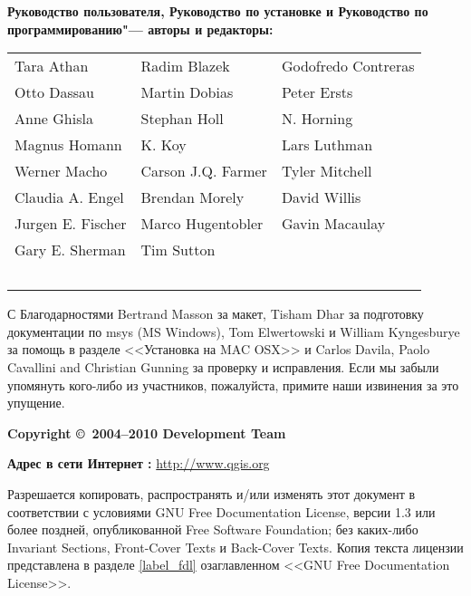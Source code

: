 \newpage

\begin{flushleft}
\textbf{Руководство пользователя, Руководство по установке и Руководство
по программированию"--- авторы и редакторы:}
  \par\bigskip\noindent
\begin{tabular}{p{4cm} p{4cm} p{4cm}}
Tara Athan & Radim Blazek & Godofredo Contreras \\
Otto Dassau & Martin Dobias & Peter Ersts \\
Anne Ghisla & Stephan Holl & N. Horning \\
Magnus Homann & K. Koy & Lars Luthman \\
Werner Macho & Carson J.Q. Farmer & Tyler Mitchell \\
Claudia A. Engel & Brendan Morely & David Willis \\
Jurgen E. Fischer & Marco Hugentobler & Gavin Macaulay \\
Gary E. Sherman & Tim Sutton \\ \
\end{tabular}
\end{flushleft}

С Благодарностями Bertrand Masson за макет, Tisham Dhar за подготовку
документации по msys (MS Windows), Tom Elwertowski и William Kyngesburye
за помощь в разделе <<Установка на MAC OSX>> и Carlos Davila, Paolo
Cavallini and Christian Gunning за проверку и исправления. Если мы
забыли упомянуть кого-либо из участников, пожалуйста, примите наши
извинения за это упущение.
\par\bigskip\noindent
\textbf{Copyright \copyright~2004--2010 \QG Development Team}
\par\bigskip\noindent
\textbf{Адрес в сети Интернет :} \url{http://www.qgis.org}

\newpage


Разрешается копировать, распространять и/или изменять этот документ в
соответствии с условиями GNU Free Documentation License, версии 1.3 или
более поздней, опубликованной Free Software Foundation; без каких-либо
Invariant Sections, Front-Cover Texts и Back-Cover Texts. Копия текста
лицензии представлена в разделе \ref{label_fdl} озаглавленном <<GNU Free
Documentation License>>.
